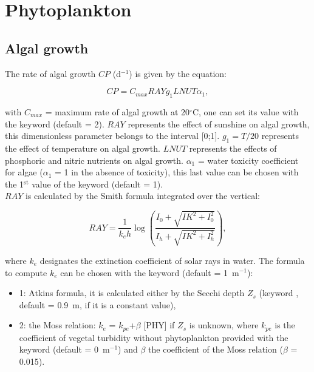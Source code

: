 \section{Phytoplankton}

\subsection{Algal growth}

The rate of algal growth $CP$ (d$^{-1}$) is given by the equation:

\begin{equation*}
  CP = C_{max} RAY g_1 LNUT \alpha_1,
\end{equation*}

with $C_{max}$ = maximum rate of algal growth at 20$^{\circ}$C,
one can set its value with the keyword  (default = 2).
$RAY$ represents the effect of sunshine on algal growth,
this dimensionless parameter belongs to the interval [0;1].
$g_1 = T/20$ represents the effect of temperature on algal growth.
$LNUT$ represents the effects of phosphoric and nitric nutrients on algal growth.
$\alpha_1$ = water toxicity coefficient for algae ($\alpha_1$ = 1 in the absence of toxicity),
this last value can be chosen with the 1$^{\textrm{st}}$ value of the keyword
 (default = 1).\\
$RAY$ is calculated by the Smith formula integrated over the vertical:

\begin{equation*}
  RAY = \frac{1}{k_e h} \log \left( \frac{I_0 + \sqrt{IK^2+I_0^2} }{ I_h + \sqrt{IK^2+I_h^2} }  \right),
\end{equation*}

where $k_e$ designates the extinction coefficient of solar rays in water.
The formula to compute $k_e$ can be chosen with the keyword
 (default = 1~m$^{-1}$):
\begin{itemize}
  \item 1: Atkins formula, it is calculated either by the Secchi depth $Z_s$
(keyword , default = 0.9~m, if it is a constant value),
  \item 2: the Moss relation: $k_e$ = $k_{pe}$+$ \beta $ [PHY] if $Z_s$ is unknown,
    where $k_{pe}$ is the coefficient of vegetal turbidity without phytoplankton
    provided with the keyword 
    (default = 0~m$^{-1}$)
    and $\beta$ the coefficient of the Moss relation ($\beta$ = 0.015).
\end{itemize}

